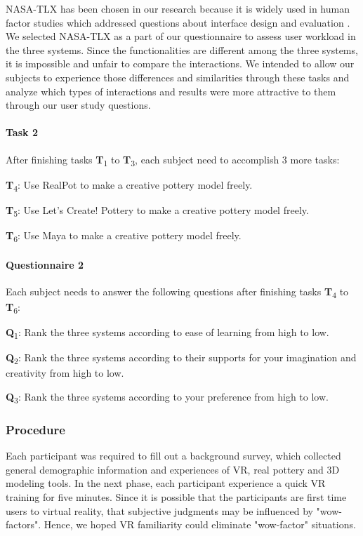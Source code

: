 \documentclass{svjour3}                     %
\begin{document}
NASA-TLX has been chosen in our research because it is widely used in human factor studies which addressed questions about interface design and evaluation \cite{hart2006nasa}.
We selected NASA-TLX as a part of our questionnaire to assess user workload in the three systems.
Since the functionalities are different among the three systems, it is impossible and unfair to compare the interactions.
We intended to allow our subjects to experience those differences and similarities through these tasks and analyze which types of interactions and results were more attractive to them through our user study questions.

\paragraph{Task 2} After finishing tasks \textbf{T}\textsubscript{1} to \textbf{T}\textsubscript{3}, each subject need to accomplish 3 more tasks:

\textbf{T}\textsubscript{4}: Use RealPot to make a creative pottery model freely.

\textbf{T}\textsubscript{5}: Use Let's Create! Pottery to make a creative pottery model freely.

\textbf{T}\textsubscript{6}: Use Maya to make a creative pottery model freely.

\paragraph{Questionnaire 2} Each subject needs to answer the following questions after finishing tasks \textbf{T}\textsubscript{4} to \textbf{T}\textsubscript{6}:

\textbf{Q}\textsubscript{1}: Rank the three systems according to ease of learning from high to low.

\textbf{Q}\textsubscript{2}: Rank the three systems according to their supports for your imagination and creativity from high to low.

\textbf{Q}\textsubscript{3}: Rank the three systems according to your preference from high to low.






\subsubsection{Procedure}
Each participant was required to fill out a background survey, which collected general demographic information and experiences of VR, real pottery and 3D modeling tools.
In the next phase, each participant experience a quick VR training for five minutes.
Since it is possible that the participants are first time users to virtual reality, that subjective judgments may be influenced by "wow-factors".
Hence, we hoped VR familiarity could eliminate "wow-factor" situations.
\end{document}

